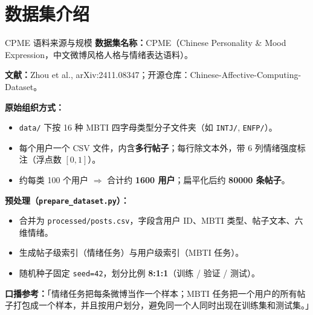 \section{数据集介绍}

\begin{frame}[allowframebreaks]{CPME 语料来源与规模}
    \small
    \textbf{数据集名称：}CPME（Chinese Personality \& Mood Expression，中文微博风格人格与情绪表达语料）。

    \vspace{0.3em}
    \textbf{文献：}Zhou et al., arXiv:2411.08347；开源仓库：Chinese-Affective-Computing-Dataset。

    \vspace{0.3em}
    \textbf{原始组织方式：}
    \begin{itemize}
        \item \texttt{data/} 下按 16 种 MBTI 四字母类型分子文件夹（如 \texttt{INTJ/}, \texttt{ENFP/}）。
        \item 每个用户一个 CSV 文件，内含\textbf{多行帖子}；每行除文本外，带 6 列情绪强度标注（浮点数 $[0,1]$）。
        \item 约每类 100 个用户 $\Rightarrow$ 合计约 \textbf{1600 用户}；扁平化后约 \textbf{80000 条帖子}。
    \end{itemize}

    \vspace{0.3em}
    \textbf{预处理（\texttt{prepare\_dataset.py}）：}
    \begin{itemize}
        \item 合并为 \texttt{processed/posts.csv}，字段含用户 ID、MBTI 类型、帖子文本、六维情绪。
        \item 生成帖子级索引（情绪任务）与用户级索引（MBTI 任务）。
        \item 随机种子固定 \texttt{seed=42}，划分比例 \textbf{8:1:1}（训练 / 验证 / 测试）。
    \end{itemize}

    \vspace{0.3em}
    \textbf{口播参考：}「情绪任务把每条微博当作一个样本；MBTI 任务把一个用户的所有帖子打包成一个样本，并且按用户划分，避免同一个人同时出现在训练集和测试集。」
\end{frame}

